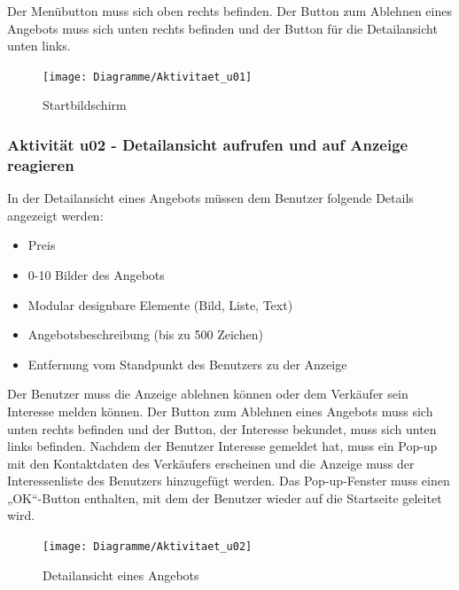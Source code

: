 \documentclass[a4paper,12pt,oneside]{scrartcl}
\begin{document}
Der Menübutton muss sich oben rechts befinden.
Der Button zum Ablehnen eines Angebots muss sich unten rechts befinden und der Button für die Detailansicht unten links.

\begin{figure}[!htbp]
\centering
\noindent\texttt{[image: Diagramme/Aktivitaet\_u01]}
\caption{Startbildschirm}
\end{figure}
\FloatBarrier


\hypertarget{u02}{\subsubsection{Aktivität u02 - Detailansicht aufrufen und auf Anzeige reagieren}}
In der Detailansicht eines Angebots müssen dem Benutzer folgende Details angezeigt werden:
\begin{itemize}
	\item Preis
	\item 0-10 Bilder des Angebots
	\item Modular designbare Elemente (Bild, Liste, Text)
	\item Angebotsbeschreibung (bis zu 500 Zeichen)
	\item Entfernung vom Standpunkt des Benutzers zu der Anzeige
\end{itemize}
Der Benutzer muss die Anzeige ablehnen können oder dem Verkäufer sein Interesse melden können.
Der Button zum Ablehnen eines Angebots muss sich unten rechts befinden und der Button, der Interesse bekundet, muss sich unten links befinden.
Nachdem der Benutzer Interesse gemeldet hat, muss ein Pop-up mit den Kontaktdaten des Verkäufers erscheinen und die Anzeige muss der Interessenliste des Benutzers hinzugefügt werden.
Das Pop-up-Fenster muss einen „OK“-Button enthalten, mit dem der Benutzer wieder auf die Startseite geleitet wird.

\begin{figure}[!htbp]
\centering
\noindent\texttt{[image: Diagramme/Aktivitaet\_u02]}
\caption{Detailansicht eines Angebots}
\end{figure}
\FloatBarrier
\end{document}

